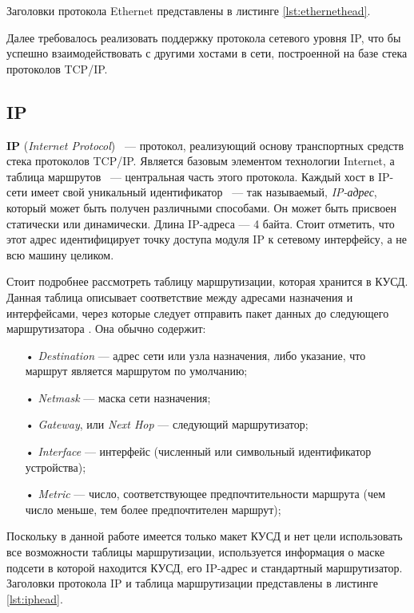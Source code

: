 Заголовки протокола Ethernet представлены в листинге \ref{lst:ethernethead}. 

{\small{}}

Далее требовалось реализовать поддержку протокола сетевого уровня IP, что бы успешно взаимодействовать с другими хостами в сети, построенной на базе стека протоколов TCP/IP.

\subsection{IP}

\textbf{IP} (\textit{Internet Protocol}) ~--- протокол, реализующий основу транспортных средств стека протоколов TCP/IP. Является базовым элементом технологии Internet, а таблица маршрутов ~--- центральная часть этого протокола. Каждый хост в IP-сети имеет свой уникальный идентификатор ~--- так называемый, \textit{IP-адрес}, который может быть получен различными способами. Он может быть присвоен статически или динамически. Длина IP-адреса --- 4 байта. Стоит отметить, что этот адрес идентифицирует точку доступа модуля IP к сетевому интерфейсу, а не всю машину целиком.

Стоит подробнее рассмотреть таблицу маршрутизации, которая хранится в КУСД. Данная таблица описывает соответствие между адресами назначения и интерфейсами, через которые следует отправить пакет данных до следующего маршрутизатора \cite{ip}. Она обычно содержит:
\begin{itemize}
	\item[•] \textit{Destination} --- адрес сети или узла назначения, либо указание, что маршрут является маршрутом по умолчанию;
	\item[•] \textit{Netmask} --- маска сети назначения;
	\item[•] \textit{Gateway}, или \textit{Next Hop} --- следующий маршрутизатор;
	\item[•] \textit{Interface} --- интерфейс (численный или символьный идентификатор устройства);
	\item[•] \textit{Metric} --- число, соответствующее предпочтительности маршрута (чем число меньше, тем более предпочтителен маршрут);
\end{itemize}

Поскольку в данной работе имеется только макет КУСД и нет цели использовать все возможности таблицы маршрутизации, используется информация о маске подсети в которой находится КУСД, его IP-адрес и стандартный маршрутизатор. Заголовки протокола IP и таблица маршрутизации представлены в листинге \ref{lst:iphead}.

